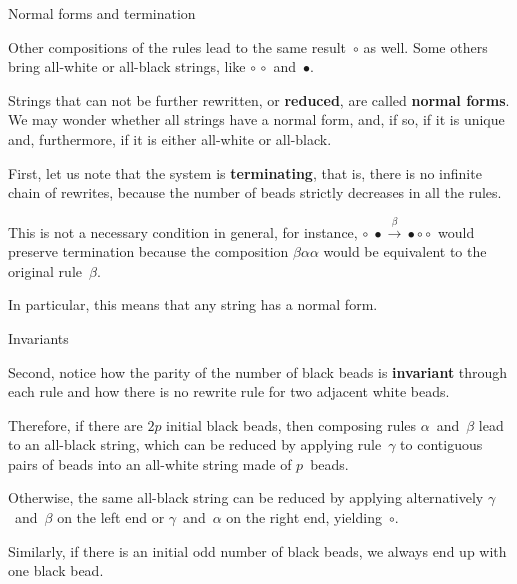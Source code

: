 \documentclass[compress,dvipdfmx]{beamer}
\begin{document}
%
\begin{frame}{Normal forms and termination}

  \label{termination1}

  Other compositions of the rules lead to the same result~\(\circ\) as
  well. Some others bring all\hyp{}white or all\hyp{}black strings,
  like \(\circ \, \circ\) and~\(\bullet\).

  \bigskip

  Strings that can not be further rewritten, or \textbf{reduced}, are
  called \textbf{normal forms}. We may wonder whether all strings have
  a normal form, and, if so, if it is unique and, furthermore, if it
  is either all\hyp{}white or all\hyp{}black.

  \bigskip

  First, let us note that the system is \textbf{terminating}, that is,
  there is no infinite chain of rewrites, because the number of beads
  strictly decreases in all the rules.

  \bigskip

  This is not a necessary condition in general, for instance, \(\circ
  \; \bullet \xrightarrow{\beta} \bullet \circ \circ\) would preserve
  termination because the composition \(\beta\alpha\alpha\) would be
  equivalent to the original rule~\(\beta\).

  \bigskip

  In particular, this means that any string has a normal form.

\end{frame}

%
\begin{frame}{Invariants}

  Second, notice how the parity of the number of black beads is
  \textbf{invariant} through each rule and how there is no rewrite
  rule for two adjacent white beads.

  \bigskip

  Therefore, if there are \(2p\) initial black beads, then composing
  rules \(\alpha\)~and~\(\beta\) lead to an all\hyp{}black string,
  which can be reduced by applying rule~\(\gamma\) to contiguous pairs
  of beads into an all\hyp{}white string made of \(p\)~beads.

  \bigskip

  Otherwise, the same all\hyp{}black string can be reduced by applying
  alternatively \(\gamma\)~and~\(\beta\) on the left end or
  \(\gamma\)~and~\(\alpha\) on the right end, yielding~\(\circ\).

  \bigskip

  Similarly, if there is an initial odd number of black beads, we
  always end up with one black bead.

\end{frame}
\end{document}
